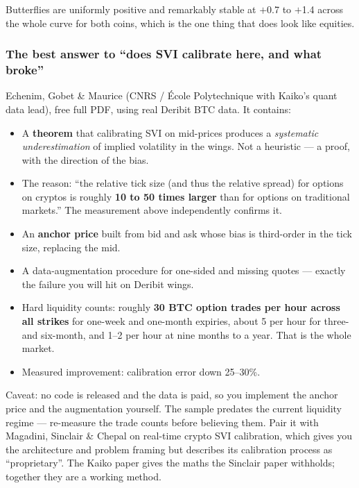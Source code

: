 \documentclass[11pt,a4paper]{article}
\newcommand{\srcnote}[1]{{\footnotesize\color{soft}#1\par}}
\begin{document}
Butterflies are uniformly positive and remarkably stable at $+$0.7 to $+$1.4
across the whole curve for both coins, which is the one thing that does look like
equities.

\subsubsection{The best answer to ``does SVI calibrate here, and what broke''}

Echenim, Gobet \& Maurice (CNRS / \'Ecole Polytechnique with Kaiko's quant data
lead), free full PDF, using real Deribit BTC data. It contains:

\begin{itemize}
\item A \textbf{theorem} that calibrating SVI on mid-prices produces a
\emph{systematic underestimation} of implied volatility in the wings. Not a
heuristic --- a proof, with the direction of the bias.
\item The reason: ``the relative tick size (and thus the relative spread) for
options on cryptos is roughly \textbf{10 to 50 times larger} than for options on
traditional markets.'' The measurement above independently confirms it.
\item An \textbf{anchor price} built from bid and ask whose bias is third-order in
the tick size, replacing the mid.
\item A data-augmentation procedure for one-sided and missing quotes --- exactly
the failure you will hit on Deribit wings.
\item Hard liquidity counts: roughly \textbf{30 BTC option trades per hour across
all strikes} for one-week and one-month expiries, about 5 per hour for three- and
six-month, and 1--2 per hour at nine months to a year. That is the whole market.
\item Measured improvement: calibration error down 25--30\%.
\end{itemize}

\srcnote{Caveat: no code is released and the data is paid, so you implement the
anchor price and the augmentation yourself. The sample predates the current
liquidity regime --- re-measure the trade counts before believing them. Pair it
with Magadini, Sinclair \& Chepal on real-time crypto SVI calibration, which gives
you the architecture and problem framing but describes its calibration process as
``proprietary''. The Kaiko paper gives the maths the Sinclair paper withholds;
together they are a working method.}
\end{document}
